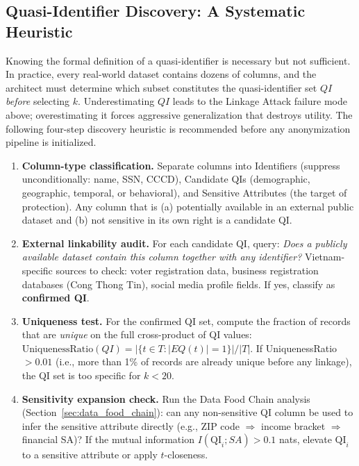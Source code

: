 \subsection{Quasi-Identifier Discovery: A Systematic Heuristic}
\label{subsec:qi_discovery}

Knowing the formal definition of a quasi-identifier is necessary but not sufficient. In practice, every real-world dataset contains dozens of columns, and the architect must determine which subset constitutes the quasi-identifier set $QI$ \emph{before} selecting $k$. Underestimating $QI$ leads to the Linkage Attack failure mode above; overestimating it forces aggressive generalization that destroys utility. The following four-step discovery heuristic is recommended before any anonymization pipeline is initialized.

\begin{enumerate}
  \item \textbf{Column-type classification.} Separate columns into Identifiers (suppress unconditionally: name, SSN, CCCD), Candidate QIs (demographic, geographic, temporal, or behavioral), and Sensitive Attributes (the target of protection). Any column that is (a) potentially available in an external public dataset and (b) not sensitive in its own right is a candidate QI.
  \item \textbf{External linkability audit.} For each candidate QI, query: \emph{Does a publicly available dataset contain this column together with any identifier?} Vietnam-specific sources to check: voter registration data, business registration databases (Cong Thong Tin), social media profile fields. If yes, classify as \textbf{confirmed QI}.
  \item \textbf{Uniqueness test.} For the confirmed QI set, compute the fraction of records that are \emph{unique} on the full cross-product of QI values: $\mathrm{UniquenessRatio}(QI) = |\{t \in T : |EQ(t)| = 1\}| / |T|$. If UniquenessRatio $> 0.01$ (i.e., more than 1\% of records are already unique before any linkage), the QI set is too specific for $k < 20$.
  \item \textbf{Sensitivity expansion check.} Run the Data Food Chain analysis (Section~\ref{sec:data_food_chain}): can any non-sensitive QI column be used to infer the sensitive attribute directly (e.g., ZIP code $\Rightarrow$ income bracket $\Rightarrow$ financial SA)? If the mutual information $I(\text{QI}_i; SA) > 0.1$ nats, elevate $\text{QI}_i$ to a sensitive attribute or apply $t$-closeness.
\end{enumerate}

